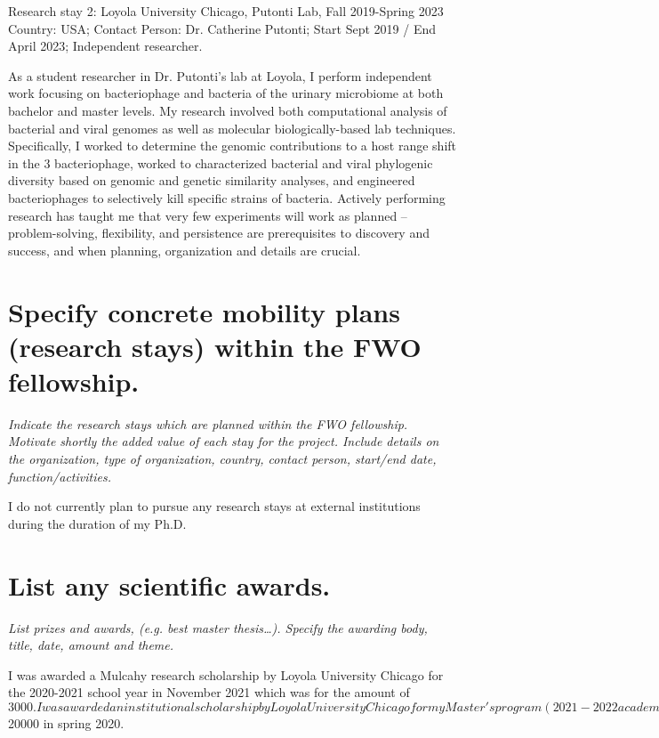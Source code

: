 {Research stay 2: Loyola University Chicago, Putonti Lab, Fall 2019-Spring 2023
Country: USA; Contact Person: Dr. Catherine Putonti; Start Sept 2019 / End April 2023; Independent researcher.

As a student researcher in Dr. Putonti’s lab at Loyola, I perform independent work focusing on bacteriophage and bacteria of the urinary microbiome at both bachelor and master levels. 
My research involved both computational analysis of bacterial and viral genomes as well as molecular biologically-based lab techniques. 
Specifically, I worked to determine the genomic contributions to a host range shift in the 3 bacteriophage, worked to characterized bacterial and viral phylogenic diversity based on genomic and genetic similarity analyses, and engineered bacteriophages to selectively kill specific strains of bacteria. 
Actively performing research has taught me that very few experiments will work as planned -- problem-solving, flexibility, and persistence are prerequisites to discovery and success, and when planning, organization and details are crucial. 





\section{Specify concrete mobility plans (research stays) within the FWO fellowship.}
\textit{
Indicate the research stays which are planned within the FWO fellowship. 
Motivate shortly the added value of each stay for the project. Include details on the organization, type of organization, country, contact person, start/end date, function/activities. 
}

I do not currently plan to pursue any research stays at external institutions during the duration of my Ph.D.


\section{List any scientific awards.}
\textit{
List prizes and awards, (e.g. best master thesis…). Specify the awarding body, title, date, amount and theme.
}

I was awarded a Mulcahy research scholarship by Loyola University Chicago for the 2020-2021 school year in November 2021 which was for the amount of $3000. 

I was awarded an institutional scholarship by Loyola University Chicago for my Master's program (2021-2022 academic year) for a total of $20000 in spring 2020.

}
